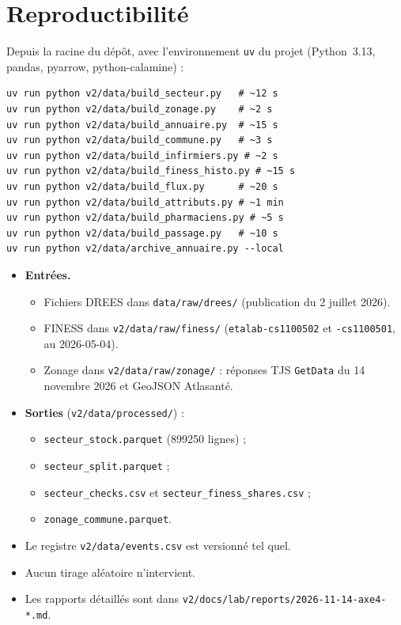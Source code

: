 \section{Reproductibilité}
Depuis la racine du dépôt, avec l'environnement \texttt{uv} du projet (Python~3.13, pandas, pyarrow,
python-calamine) :
\begin{verbatim}
uv run python v2/data/build_secteur.py   # ~12 s
uv run python v2/data/build_zonage.py    # ~2 s
uv run python v2/data/build_annuaire.py  # ~15 s
uv run python v2/data/build_commune.py   # ~3 s
uv run python v2/data/build_infirmiers.py # ~2 s
uv run python v2/data/build_finess_histo.py # ~15 s
uv run python v2/data/build_flux.py      # ~20 s
uv run python v2/data/build_attributs.py # ~1 min
uv run python v2/data/build_pharmaciens.py # ~5 s
uv run python v2/data/build_passage.py   # ~10 s
uv run python v2/data/archive_annuaire.py --local
\end{verbatim}
\begin{itemize}
  \item \textbf{Entrées.}
  \begin{itemize}
    \item Fichiers DREES dans \texttt{data/raw/drees/} (publication du 2 juillet 2026).
    \item FINESS dans \texttt{v2/data/raw/finess/} (\texttt{etalab-cs1100502} et \texttt{-cs1100501}, au
    2026-05-04).
    \item Zonage dans \texttt{v2/data/raw/zonage/} : réponses TJS \texttt{GetData} du 14 novembre 2026 et GeoJSON
    Atlasanté.
  \end{itemize}
  \item \textbf{Sorties} (\texttt{v2/data/processed/}) :
  \begin{itemize}
    \item \texttt{secteur\_stock.parquet} (\num{899250} lignes) ;
    \item \texttt{secteur\_split.parquet} ;
    \item \texttt{secteur\_checks.csv} et \texttt{secteur\_finess\_shares.csv} ;
    \item \texttt{zonage\_commune.parquet}.
  \end{itemize}
  \item Le registre \texttt{v2/data/events.csv} est versionné tel quel.
  \item Aucun tirage aléatoire n'intervient.
  \item Les rapports détaillés sont dans \texttt{v2/docs/lab/reports/2026-11-14-axe4-*.md}.
\end{itemize}

